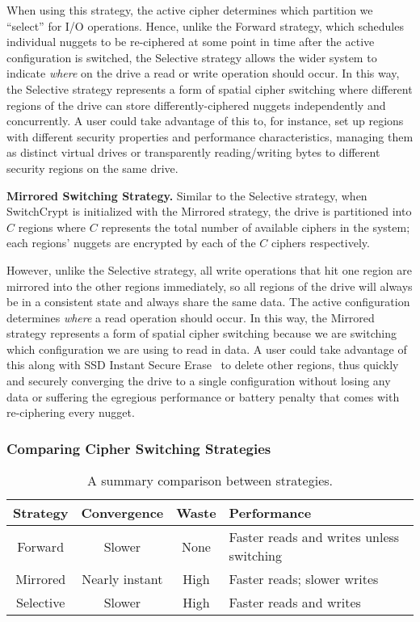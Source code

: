 When using this strategy, the active cipher determines which partition we
``select'' for I/O operations. Hence, unlike the Forward strategy, which
schedules individual nuggets to be re-ciphered at some point in time after the
active configuration is switched, the Selective strategy allows the wider system
to indicate \emph{where} on the drive a read or write operation should occur. In
this way, the Selective strategy represents a form of spatial cipher switching
where different regions of the drive can store differently-ciphered nuggets
independently and concurrently. A user could take advantage of this to, for
instance, set up regions with different security properties and performance
characteristics, managing them as distinct virtual drives or transparently
reading/writing bytes to different security regions on the same drive.

\textbf{Mirrored Switching Strategy.} Similar to the Selective strategy, when
SwitchCrypt is initialized with the Mirrored strategy, the drive is partitioned
into $C$ regions where $C$ represents the total number of available ciphers in
the system; each regions' nuggets are encrypted by each of the $C$ ciphers
respectively.

However, unlike the Selective strategy, all write operations that hit one region
are mirrored into the other regions immediately, so all regions of the drive
will always be in a consistent state and always share the same data. The active
configuration determines \emph{where} a read operation should occur. In this
way, the Mirrored strategy represents a form of spatial cipher switching because
we are switching which configuration we are using to read in data. A user could
take advantage of this along with SSD Instant Secure Erase~\cite{ISE1,ISE2,ISE3}
to delete other regions, thus quickly and securely converging the drive to a
single configuration without losing any data or suffering the egregious
performance or battery penalty that comes with re-ciphering every nugget.

\subsubsection{Comparing Cipher Switching Strategies}

\begin{table}[ht]
   \begin{tabular}{@{}|c|c|c|C{25mm}|@{}}
      \toprule
      \textbf{Strategy} & \textbf{Convergence} & \textbf{Waste} &
      \textbf{Performance} \\
      \midrule
      Forward   & Slower       & None & Faster reads and writes unless switching
      \\\hline
      Mirrored  & Nearly instant & High & Faster reads; slower writes \\
      \hline
      Selective & Slower       & High & Faster reads and writes  \\
      \hline
   \end{tabular}
   \caption{A summary comparison between strategies.}
   \label{tbl:strategies-advantages}
\end{table}

